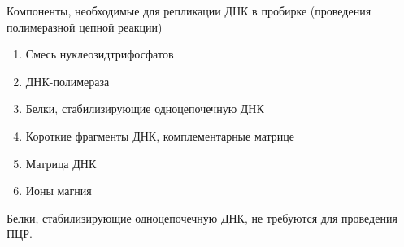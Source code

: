 
Компоненты, необходимые для репликации ДНК в пробирке (проведения
полимеразной цепной реакции)

\begin{enumerate}
    \item Смесь нуклеозидтрифосфатов  
    \item ДНК-полимераза 
    \item Белки, стабилизирующие одноцепочечную ДНК   
    \item Короткие фрагменты ДНК, комплементарные матрице  
    \item Матрица ДНК  
    \item Ионы магния 
\end{enumerate}


\explanationSection

Белки, стабилизирующие одноцепочечную ДНК, не требуются для проведения ПЦР.

